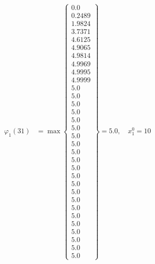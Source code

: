\documentclass{article}
\begin{document}
\begin{align*}
\varphi_{1}(31) &= \max \left\{ \begin{array}{c}
0.0 \\
 0.2489 \\
 1.9824 \\
 3.7371 \\
 4.6125 \\
 4.9065 \\
 4.9814 \\
 4.9969 \\
 4.9995 \\
 4.9999 \\
 5.0 \\
 5.0 \\
 5.0 \\
 5.0 \\
 5.0 \\
 5.0 \\
 5.0 \\
 5.0 \\
 5.0 \\
 5.0 \\
 5.0 \\
 5.0 \\
 5.0 \\
 5.0 \\
 5.0 \\
 5.0 \\
 5.0 \\
 5.0 \\
 5.0 \\
 5.0 \\
 5.0 \\
 5.0
\end{array} \right\}=5.0, \quad x_{1}^0=10\\
  

\end{align*}
\end{document}
